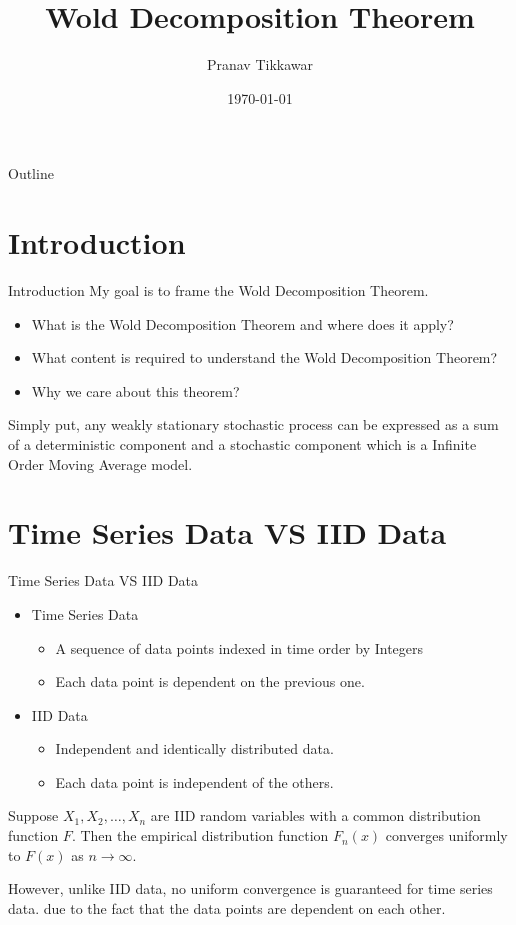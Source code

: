 \documentclass{beamer}
\title{Wold Decomposition Theorem}
\author{Pranav Tikkawar}
\date{\today}
\begin{document}
 

\begin{frame}
    \titlepage
\end{frame}

\begin{frame}{Outline}
    \tableofcontents
\end{frame}

\section{Introduction}
\begin{frame}{Introduction}
    My goal is to frame the Wold Decomposition Theorem. 
    \begin{itemize}
        \item What is the Wold Decomposition Theorem and where does it apply?
        \item What content is required to understand the Wold Decomposition Theorem? 
        \item Why we care about this theorem?
    \end{itemize}
    \begin{definition}
        Simply put, any weakly stationary stochastic process can be expressed as a sum of a deterministic component and a stochastic component which is a Infinite Order Moving Average model.
    \end{definition}
\end{frame}

\section{Time Series Data VS IID Data}
\begin{frame}{Time Series Data VS IID Data}
    \begin{itemize}
        \item Time Series Data
        \begin{itemize}
            \item A sequence of data points indexed in time order by Integers
            \item Each data point is dependent on the previous one.
        \end{itemize}
        \item IID Data
        \begin{itemize}
            \item Independent and identically distributed data.
            \item Each data point is independent of the others.
        \end{itemize}
    \end{itemize}
    \begin{theorem}
        Suppose $X_1, X_2, \ldots, X_n$ are IID random variables with a common distribution function $F$. Then the empirical distribution function $F_n(x)$ converges uniformly to $F(x)$ as $n \to \infty$.
    \end{theorem}
    However, unlike IID data, no uniform convergence is guaranteed for time series data. due to the fact that the data points are dependent on each other.
\end{frame}
\end{document}
